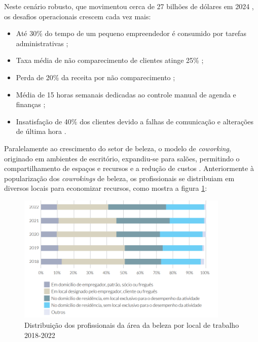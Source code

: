 \FloatBarrier

Neste cenário robusto, que movimentou cerca de 27 bilhões de dólares em 2024 \cite{ecommercenapratica2025}, os desafios operacionais crescem cada vez mais: 

\begin{itemize}
	\item Até 30\% do tempo de um pequeno empreendedor é consumido por tarefas administrativas \cite{senac2022};
	\item Taxa média de não comparecimento de clientes atinge 25\% \cite{booksy2022};
	\item Perda de 20\% da receita por não comparecimento \cite{abihpec2021};
	\item Média de 15 horas semanais dedicadas ao controle manual de agenda e finanças \cite{fgv2020};
	\item Insatisfação de 40\% dos clientes devido a falhas de comunicação e alterações de última hora \cite{mindminers2022}.
\end{itemize}

Paralelamente ao crescimento do setor de beleza, o modelo de \emph{coworking}, originado em ambientes de escritório, expandiu-se para salões, permitindo o compartilhamento de espaços e recursos e a redução de custos \cite{sebrae_coworking,sebraesc2025}. Anteriormente à popularização dos \emph{cowrokings} de beleza, os profissionais se distribuiam em diversos locais para economizar recursos, como mostra a figura \ref{fig:Distribuição_locais}:

\begin{figure}[htb]
	\centering
	\includegraphics[width=0.9\textwidth]{cap01-Introducao/Images/1.3_local_trabalho_profissionais}
	\caption{Distribuição dos profissionais da área da beleza por local de trabalho 2018-2022}
	\label{fig:Distribuição_locais}
\end{figure}

